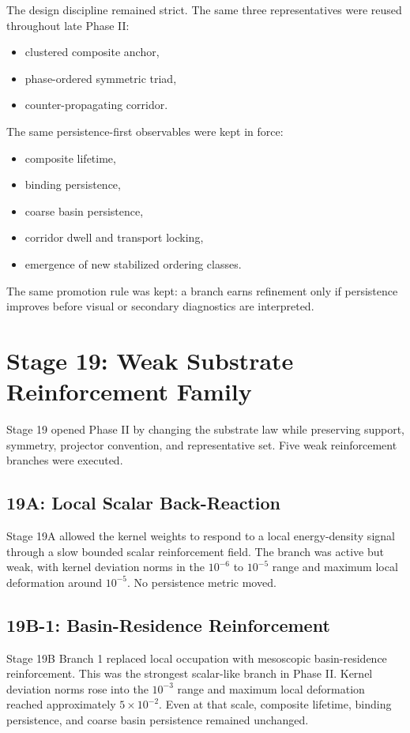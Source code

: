 \documentclass[11pt]{article}
\begin{document}
The design discipline remained strict. The same three representatives were reused throughout late Phase II:
\begin{itemize}
\item clustered composite anchor,
\item phase-ordered symmetric triad,
\item counter-propagating corridor.
\end{itemize}
The same persistence-first observables were kept in force:
\begin{itemize}
\item composite lifetime,
\item binding persistence,
\item coarse basin persistence,
\item corridor dwell and transport locking,
\item emergence of new stabilized ordering classes.
\end{itemize}
The same promotion rule was kept: a branch earns refinement only if persistence improves before visual or secondary diagnostics are interpreted.

\section{Stage 19: Weak Substrate Reinforcement Family}

Stage 19 opened Phase II by changing the substrate law while preserving support, symmetry, projector convention, and representative set. Five weak reinforcement branches were executed.

\subsection{19A: Local Scalar Back-Reaction}

Stage 19A allowed the kernel weights to respond to a local energy-density signal through a slow bounded scalar reinforcement field. The branch was active but weak, with kernel deviation norms in the $10^{-6}$ to $10^{-5}$ range and maximum local deformation around $10^{-5}$. No persistence metric moved.

\subsection{19B-1: Basin-Residence Reinforcement}

Stage 19B Branch 1 replaced local occupation with mesoscopic basin-residence reinforcement. This was the strongest scalar-like branch in Phase II. Kernel deviation norms rose into the $10^{-3}$ range and maximum local deformation reached approximately $5\times10^{-2}$. Even at that scale, composite lifetime, binding persistence, and coarse basin persistence remained unchanged.
\end{document}
